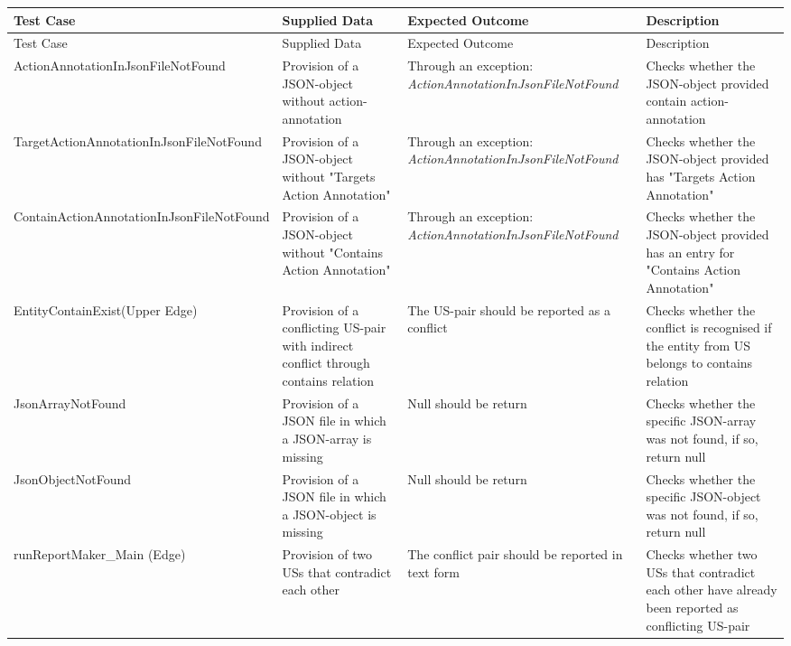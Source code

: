 \begin{tabularx}{\textwidth}{X  X  X  X}
	\hline
	Test Case &Supplied Data&Expected Outcome&Description\\
	\hline\hline
	\endfirsthead
	\hline
	Test Case &Supplied Data&Expected Outcome&Description\\
	\hline\hline
	\endhead
	
	ActionAnnotation\newline InJsonFileNotFound&Provision of a JSON-object without action-annotation&Through an exception: \textit{ActionAnnotationInJsonFileNotFound}&Checks whether the JSON-object provided contain action-annotation\\
	
	TargetActionAnnotation\newline InJsonFileNotFound&Provision of a JSON-object without "Targets Action Annotation"&Through an exception: \textit{ActionAnnotationInJsonFileNotFound}&Checks whether the JSON-object provided has "Targets Action Annotation"\\
	
	ContainActionAnnotation\newline InJsonFileNotFound&Provision of a JSON-object without "Contains Action Annotation"&Through an exception: \textit{ActionAnnotationInJsonFileNotFound}&Checks whether the JSON-object provided has an entry for "Contains Action Annotation"\\
	
	EntityContainExist\newline (Upper Edge)&Provision of a conflicting US-pair with indirect conflict through contains relation&The US-pair should be reported as a conflict&Checks whether the conflict is recognised if the entity from US belongs to contains relation\\
	
	JsonArrayNotFound&Provision of a JSON file in which a JSON-array is missing&Null should be return&Checks whether the specific JSON-array was not found, if so, return null\\
	
	JsonObjectNotFound&Provision of a JSON file in which a JSON-object is missing&Null should be return&Checks whether the specific JSON-object was not found, if so, return null\\
	
	runReportMaker\_Main \newline (Edge)&Provision of two USs that contradict each other&The conflict pair should be reported in text form&Checks whether two USs that contradict each other have already been reported as conflicting US-pair\\
	

\end{tabularx}
